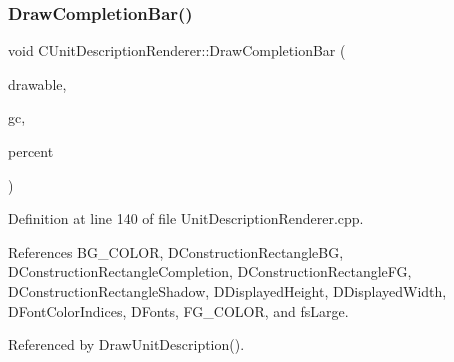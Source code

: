 \subsubsection{\texorpdfstring{Draw\+Completion\+Bar()}{DrawCompletionBar()}}
{\footnotesize\ttfamily void C\+Unit\+Description\+Renderer\+::\+Draw\+Completion\+Bar (\begin{DoxyParamCaption}\item[{Gdk\+Drawable $\ast$}]{drawable,  }\item[{Gdk\+GC $\ast$}]{gc,  }\item[{int}]{percent }\end{DoxyParamCaption})\hspace{0.3cm}{\ttfamily [protected]}}



Definition at line 140 of file Unit\+Description\+Renderer.\+cpp.



References B\+G\+\_\+\+C\+O\+L\+OR, D\+Construction\+Rectangle\+BG, D\+Construction\+Rectangle\+Completion, D\+Construction\+Rectangle\+FG, D\+Construction\+Rectangle\+Shadow, D\+Displayed\+Height, D\+Displayed\+Width, D\+Font\+Color\+Indices, D\+Fonts, F\+G\+\_\+\+C\+O\+L\+OR, and fs\+Large.



Referenced by Draw\+Unit\+Description().


